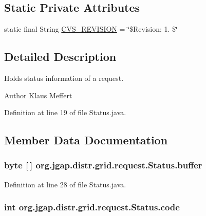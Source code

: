 \subsection*{Static Private Attributes}
\begin{DoxyCompactItemize}
\item 
static final String \hyperlink{classorg_1_1jgap_1_1distr_1_1grid_1_1request_1_1_status_a5607ece9d1040f612f4b8323cfda00b0}{C\-V\-S\-\_\-\-R\-E\-V\-I\-S\-I\-O\-N} = \char`\"{}\$Revision\-: 1. \$\char`\"{}
\end{DoxyCompactItemize}


\subsection{Detailed Description}
Holds status information of a request.

\begin{DoxyAuthor}{Author}
Klaus Meffert 
\end{DoxyAuthor}


Definition at line 19 of file Status.\-java.



\subsection{Member Data Documentation}
\hypertarget{classorg_1_1jgap_1_1distr_1_1grid_1_1request_1_1_status_a74da1624d44f3fca0d2abce45147aa22}{
\subsubsection[{buffer}]{\setlength{\rightskip}{0pt plus 5cm}byte \mbox{[}$\,$\mbox{]} org.\-jgap.\-distr.\-grid.\-request.\-Status.\-buffer}}\label{classorg_1_1jgap_1_1distr_1_1grid_1_1request_1_1_status_a74da1624d44f3fca0d2abce45147aa22}


Definition at line 28 of file Status.\-java.

\hypertarget{classorg_1_1jgap_1_1distr_1_1grid_1_1request_1_1_status_a87e194357e88627d286d9aa8a31550b3}{
\subsubsection[{code}]{\setlength{\rightskip}{0pt plus 5cm}int org.\-jgap.\-distr.\-grid.\-request.\-Status.\-code}}\label{classorg_1_1jgap_1_1distr_1_1grid_1_1request_1_1_status_a87e194357e88627d286d9aa8a31550b3}


